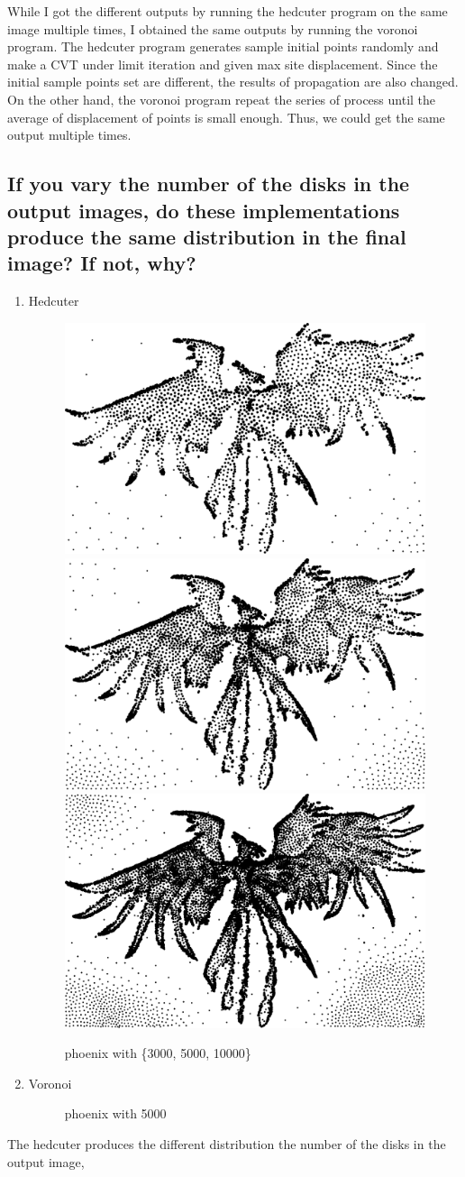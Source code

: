 \documentclass[11pt]{article}
\begin{document}
While I got the different outputs by running the hedcuter program on the same image multiple times, I obtained the same outputs by running the voronoi program. The hedcuter program generates sample initial points randomly and make a CVT under limit iteration and given max site displacement. Since the initial sample points set are different, the results of propagation are also changed. On the other hand, the voronoi program repeat the series of process until the average of displacement of points is small enough. Thus, we could get the same output multiple times.

\subsection{If you vary the number of the disks in the output images, do these implementations produce the same distribution in the final image? If not, why?}

\begin{enumerate}
	\item Hedcuter
	\begin{figure}[htbp]
 	 \centering
	  \includegraphics[width=.23\textwidth]{FIGS/hedcut/svg/phoenix-3000-h1}
	  \includegraphics[width=.23\textwidth]{FIGS/hedcut/svg/phoenix-5000-h1}
	  \includegraphics[width=.23\textwidth]{FIGS/hedcut/svg/phoenix-10000-h1}
 	 \caption{phoenix with \{3000, 5000, 10000\}}
	\end{figure}
	\item Voronoi
	\begin{figure}[htbp]
 	 \centering

 	 \caption{phoenix with 5000}
	\end{figure}
\end{enumerate}
The hedcuter produces the different distribution the number of the disks in the output image, 
\end{document}
